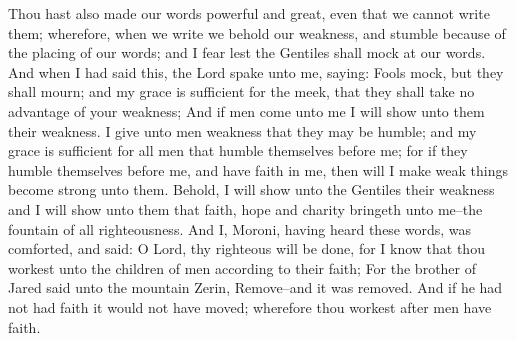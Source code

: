 \bverse \iffalse Thou hast also made our words powerful and great, even that we cannot write them; wherefore, when we write we behold our weakness, and stumble because of the placing of our words; and I fear lest the Gentiles shall mock at our words. \fi
Thou hast also made our words powerful and great, even that we cannot write them; wherefore, when we write we behold our weakness, and stumble because of the placing of our words; and I fear lest the Gentiles shall mock at our words.
\bverse \iffalse And when I had said this, the Lord spake unto me, saying: Fools mock, but they shall mourn; and my grace is sufficient for the meek, that they shall take no advantage of your weakness; \fi
And when I had said this, the Lord spake unto me, saying: Fools mock, but they shall mourn; and my grace is sufficient for the meek, that they shall take no advantage of your weakness;
\bverse \iffalse And if men come unto me I will show unto them their weakness.  I give unto men weakness that they may be humble; and my grace is sufficient for all men that humble themselves before me; for if they humble themselves before me, and have faith in me, then will I make weak things become strong unto them. \fi
And if men come unto me I will show unto them their weakness.  I give unto men weakness that they may be humble; and my grace is sufficient for all men that humble themselves before me; for if they humble themselves before me, and have faith in me, then will I make weak things become strong unto them.
\bverse \iffalse Behold, I will show unto the Gentiles their weakness and I will show unto them that faith, hope and charity bringeth unto me--the fountain of all righteousness. \fi
Behold, I will show unto the Gentiles their weakness and I will show unto them that faith, hope and charity bringeth unto me--the fountain of all righteousness.
\bverse \iffalse And I, Moroni, having heard these words, was comforted, and said: O Lord, thy righteous will be done, for I know that thou workest unto the children of men according to their faith; \fi
And I, Moroni, having heard these words, was comforted, and said: O Lord, thy righteous will be done, for I know that thou workest unto the children of men according to their faith;
\bverse \iffalse For the brother of Jared said unto the mountain Zerin, Remove--and it was removed. And if he had not had faith it would not have moved; wherefore thou workest after men have faith. \fi
For the brother of Jared said unto the mountain Zerin, Remove--and it was removed. And if he had not had faith it would not have moved; wherefore thou workest after men have faith.
